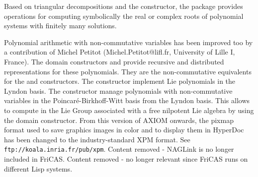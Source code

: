 Based on triangular decompositions and the  constructor,
the package 
provides operations for computing symbolically the real or complex roots
of polynomial systems with finitely many solutions.

Polynomial arithmetic with non-commutative variables
has been improved too by a contribution of Michel Petitot
(Michel.Petitot@lifl.fr, University of Lille I, France).
The domain constructors 
and  provide
recursive and distributed representations for these polynomials.
They are the non-commutative equivalents for
the 
and  constructors.
The constructor  implement Lie
polynomials in the Lyndon basis.
The constructor  manage polynomials
with non-commutative variables in
the Poincar\'e-Birkhoff-Witt basis from the Lyndon basis.
This allows to compute in the Lie Group associated with a
free nilpotent Lie algebra by using the 
domain constructor.
%
From this version of AXIOM onwards, the pixmap format used to save graphics
images in color and to display them in HyperDoc has been changed to the
industry-standard XPM format. See {\tt ftp://koala.inria.fr/pub/xpm}.
%
Content removed -  NAGLink is no longer included in FriCAS.
%
Content removed - no longer relevant since FriCAS runs on different
Lisp systems.
